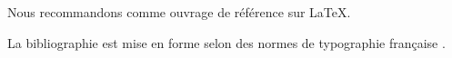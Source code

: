 \documentclass[11pt,english,french]{article}
\begin{document}
Nous recommandons \citet{Kopka:latex:4e} comme ouvrage de
référence sur {\LaTeX}.

La bibliographie est mise en forme selon des normes de
typographie française \citep{Malo:1996}.


\end{document}
